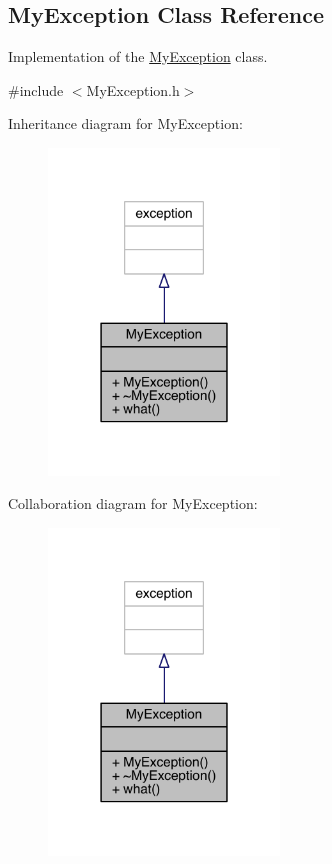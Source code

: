 \hypertarget{a00052}{}\subsection{My\+Exception Class Reference}
\label{a00052}


Implementation of the \hyperlink{a00052}{My\+Exception} class.  




{\ttfamily \#include $<$My\+Exception.\+h$>$}



Inheritance diagram for My\+Exception\+:\nopagebreak
\begin{figure}[H]
\begin{center}
\leavevmode
\includegraphics[width=174pt]{a00167}
\end{center}
\end{figure}


Collaboration diagram for My\+Exception\+:\nopagebreak
\begin{figure}[H]
\begin{center}
\leavevmode
\includegraphics[width=174pt]{a00168}
\end{center}
\end{figure}
